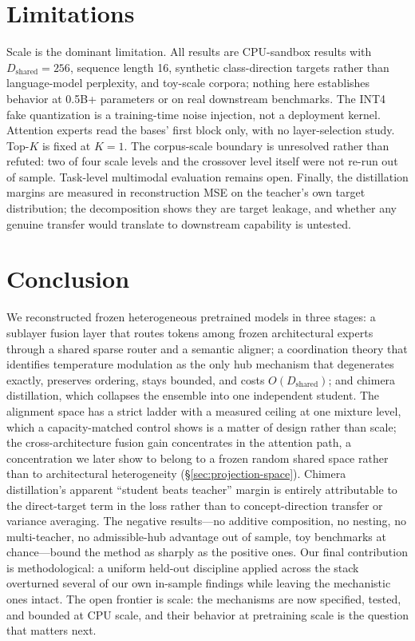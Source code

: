 \documentclass[10pt]{article}
\theoremstyle{definition}
\theoremstyle{plain}
\theoremstyle{remark}
\begin{document}
\section{Limitations}
\label{sec:limitations}

Scale is the dominant limitation. All results are CPU-sandbox results with $D_{\text{shared}}{=}256$, sequence length 16, synthetic class-direction targets rather than language-model perplexity, and toy-scale corpora; nothing here establishes behavior at 0.5B+ parameters or on real downstream benchmarks. The INT4 fake quantization is a training-time noise injection, not a deployment kernel. Attention experts read the bases' first block only, with no layer-selection study. Top-$K$ is fixed at $K{=}1$. The corpus-scale boundary is unresolved rather than refuted: two of four scale levels and the crossover level itself were not re-run out of sample. Task-level multimodal evaluation remains open. Finally, the distillation margins are measured in reconstruction MSE on the teacher's own target distribution; the decomposition shows they are target leakage, and whether any genuine transfer would translate to downstream capability is untested.

\section{Conclusion}
\label{sec:conclusion}

We reconstructed frozen heterogeneous pretrained models in three stages: a sublayer fusion layer that routes tokens among frozen architectural experts through a shared sparse router and a semantic aligner; a coordination theory that identifies temperature modulation as the only hub mechanism that degenerates exactly, preserves ordering, stays bounded, and costs $O(D_{\text{shared}})$; and chimera distillation, which collapses the ensemble into one independent student. The alignment space has a strict ladder with a measured ceiling at one mixture level, which a capacity-matched control shows is a matter of design rather than scale; the cross-architecture fusion gain concentrates in the attention path, a concentration we later show to belong to a frozen random shared space rather than to architectural heterogeneity (\S\ref{sec:projection-space}). Chimera distillation's apparent ``student beats teacher'' margin is entirely attributable to the direct-target term in the loss rather than to concept-direction transfer or variance averaging. The negative results---no additive composition, no nesting, no multi-teacher, no admissible-hub advantage out of sample, toy benchmarks at chance---bound the method as sharply as the positive ones. Our final contribution is methodological: a uniform held-out discipline applied across the stack overturned several of our own in-sample findings while leaving the mechanistic ones intact. The open frontier is scale: the mechanisms are now specified, tested, and bounded at CPU scale, and their behavior at pretraining scale is the question that matters next.
\end{document}
